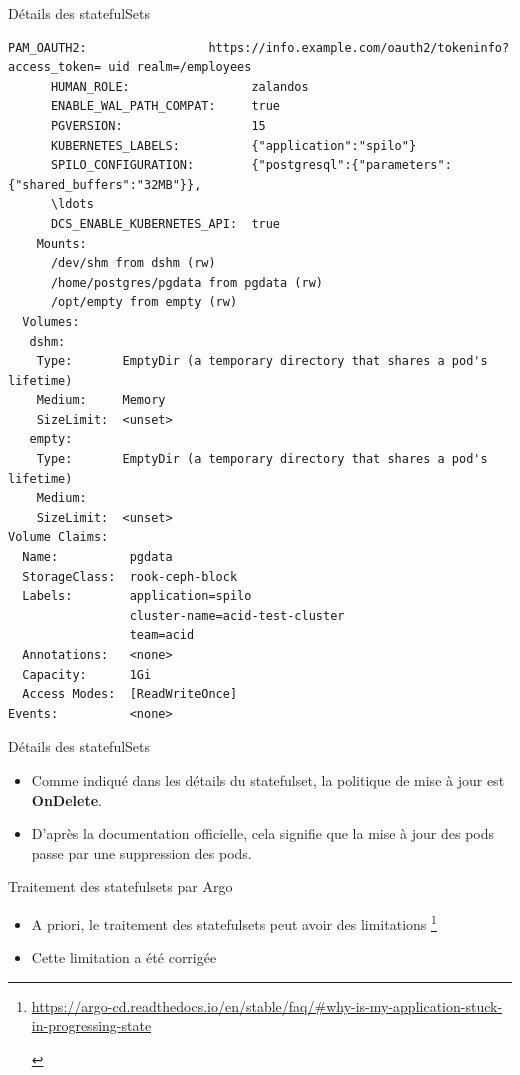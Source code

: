 \begin{frame}[fragile,shrink=8]{Détails des statefulSets}
\begin{tiny}
\begin{Verbatim}[commandchars=\&\#\#]
      PAM_OAUTH2:                 https://info.example.com/oauth2/tokeninfo?access_token= uid realm=/employees
      HUMAN_ROLE:                 zalandos
      ENABLE_WAL_PATH_COMPAT:     true
      PGVERSION:                  15
      KUBERNETES_LABELS:          {"application":"spilo"}
      SPILO_CONFIGURATION:        {"postgresql":{"parameters":{"shared_buffers":"32MB"}},
      \ldots
      DCS_ENABLE_KUBERNETES_API:  true
    Mounts:
      /dev/shm from dshm (rw)
      /home/postgres/pgdata from pgdata (rw)
      /opt/empty from empty (rw)
  Volumes:
   dshm:
    Type:       EmptyDir (a temporary directory that shares a pod's lifetime)
    Medium:     Memory
    SizeLimit:  <unset>
   empty:
    Type:       EmptyDir (a temporary directory that shares a pod's lifetime)
    Medium:     
    SizeLimit:  <unset>
Volume Claims:
  Name:          pgdata
  StorageClass:  rook-ceph-block
  Labels:        application=spilo
                 cluster-name=acid-test-cluster 
                 team=acid
  Annotations:   <none>
  Capacity:      1Gi
  Access Modes:  [ReadWriteOnce]
Events:          <none>

\end{Verbatim}
\end{tiny}

\end{frame}


\begin{frame}[fragile]{Détails des statefulSets}

   \begin{itemize}
      \item Comme indiqué dans les détails du statefulset, la politique de mise à jour est \textbf{OnDelete}.
      \item D'après la documentation officielle, cela signifie que la mise à jour des pods passe par une suppression des pods.
   \end{itemize}

\end{frame}


\begin{frame}[fragile]{Traitement des statefulsets par Argo}

   \begin{itemize}
   \item A priori, le traitement des statefulsets peut avoir des limitations \footnote{
      \begin{tcolorbox}
         \tiny{\url{https://argo-cd.readthedocs.io/en/stable/faq/\#why-is-my-application-stuck-in-progressing-state}}
      \end{tcolorbox}
}
   \item Cette limitation a été corrigée
   \end{itemize}

\end{frame}

